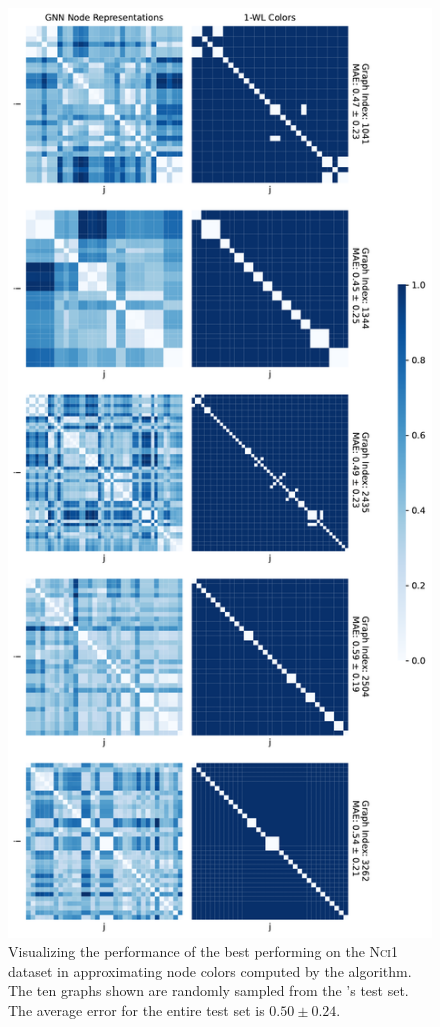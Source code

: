 \begin{figure}[H]
\begin{minipage}[b]{0.45992852703\textwidth}
    \end{minipage}
    \hfill
    \begin{minipage}[b]{0.53007147296\textwidth}
        \includegraphics[width=\textwidth, right]{Figures/heatmaps_NCI1_1.pdf}
    \end{minipage}
    \hfill
    \caption{Visualizing the performance of the best performing \gnn on the \textsc{Nci1} dataset in approximating node colors computed by the \wl algorithm. The ten graphs shown are randomly sampled from the \gnn's test set. The average error for the entire test set is $0.50 \pm 0.24$.}
    \label{fig:gnn_approx_nci_3}
\end{figure}
\clearpage


